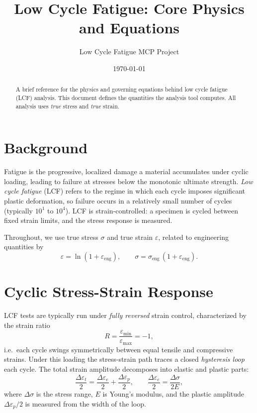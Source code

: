 \documentclass[11pt]{article}
\title{Low Cycle Fatigue: Core Physics and Equations}
\author{Low Cycle Fatigue MCP Project}
\date{\today}
\begin{document}
\maketitle

\begin{abstract}
A brief reference for the physics and governing equations behind low cycle fatigue (LCF)
analysis. This document defines the quantities the analysis tool computes. All analysis uses
\emph{true} stress and \emph{true} strain.
\end{abstract}

\section{Background}

Fatigue is the progressive, localized damage a material accumulates under cyclic loading,
leading to failure at stresses below the monotonic ultimate strength. \emph{Low cycle fatigue}
(LCF) refers to the regime in which each cycle imposes significant plastic deformation, so
failure occurs in a relatively small number of cycles (typically $10^{1}$ to $10^{4}$). LCF is
strain-controlled: a specimen is cycled between fixed strain limits, and the stress response
is measured.

Throughout, we use true stress $\sigma$ and true strain $\varepsilon$, related to engineering
quantities by
\begin{equation}
  \varepsilon = \ln(1 + \varepsilon_\text{eng}),
  \qquad
  \sigma = \sigma_\text{eng}\,(1 + \varepsilon_\text{eng}).
\end{equation}

\section{Cyclic Stress-Strain Response}

LCF tests are typically run under \emph{fully reversed} strain control, characterized by the
strain ratio
\begin{equation}
  R = \frac{\varepsilon_{\min}}{\varepsilon_{\max}} = -1,
\end{equation}
i.e.\ each cycle swings symmetrically between equal tensile and compressive strains. Under this
loading the stress-strain path traces a closed \emph{hysteresis loop} each cycle. The total
strain amplitude decomposes into elastic and plastic parts:
\begin{equation}
  \frac{\Delta\varepsilon_t}{2}
  = \frac{\Delta\varepsilon_e}{2} + \frac{\Delta\varepsilon_p}{2},
  \qquad
  \frac{\Delta\varepsilon_e}{2} = \frac{\Delta\sigma}{2E},
\end{equation}
where $\Delta\sigma$ is the stress range, $E$ is Young's modulus, and the plastic amplitude
$\Delta\varepsilon_p/2$ is measured from the width of the loop.
\end{document}
